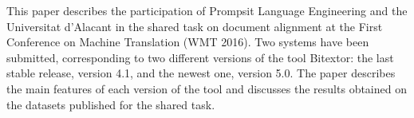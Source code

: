 This paper describes the participation of Prompsit Language Engineering and the Universitat d'Alacant in the shared task on document alignment at the First Conference on Machine Translation (WMT 2016). Two systems have been submitted, corresponding to two different versions of the tool Bitextor: the last stable release, version 4.1, and the newest one, version 5.0. The paper describes the main features of each version of the tool and discusses the results obtained on the datasets published for the shared task.
